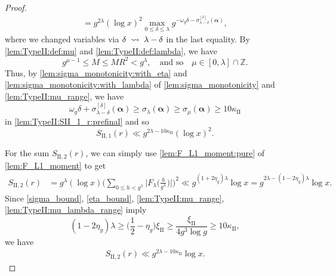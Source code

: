 \documentclass[hidelinks]{amsart}
\numberwithin{equation}{section}
\theoremstyle{plain}
\theoremstyle{definition}
\renewcommand{\leadsto}{\DOTSB\;\rightsquigarrow\;}
\begin{document}
\begin{proof}
\begin{equation}
\begin{aligned}
=
g^{2\lambda}
(\log x)^{2}
\max_{0\le\delta\le\lambda}
g^{-\omega_{g}\delta-\sigma_{\lambda-\delta}^{[\delta]}(\bm{\alpha})},
\end{aligned}
\end{equation}
where we changed variables via $\delta\leadsto\lambda-\delta$ in the last equality.
By \cref{lem:TypeII:def:mu} and \cref{lem:TypeII:def:lambda}, we have
\begin{equation}
\label{lem:TypeII:mu_lambda_range}
g^{\mu-1}\le M\le MR^{2}<g^{\lambda},
\quad\text{and so}\quad
\mu\in[0,\lambda]\cap\mathbb{Z}.
\end{equation}
Thus, by \cref{lem:sigma_monotonicity:with_eta} and \cref{lem:sigma_monotonicity:with_lambda}
of \cref{lem:sigma_monotonicity} and \cref{lem:TypeII:mu_range},
we have
\[
\omega_{g}\delta+\sigma_{\lambda-\delta}^{[\delta]}(\bm{\alpha})
\ge
\sigma_{\lambda}(\bm{\alpha})
\ge
\sigma_{\mu}(\bm{\alpha})
\ge
10\kappa_{\mathrm{II}}
\]
in \cref{lem:TypeII:SII_1_r:prefinal} and so
\begin{equation}
\label{lem:TypeII:SII_1_r}
S_{\mathrm{II},1}(r)
\ll
g^{2\lambda-10\kappa_{\mathrm{II}}}(\log x)^{2}.
\end{equation}

For the sum $S_{\mathrm{II},2}(r)$,
we can simply use \cref{lem:F_L1_moment:pure} of \cref{lem:F_L1_moment} to get
\begin{align}
S_{\mathrm{II},2}(r)
&=
g^{\lambda}(\log x)
\biggl(
\sum_{0\le h<g^{\lambda}}
\biggl|F_{\lambda}\biggl(\frac{h}{g^{\lambda}}\biggr)\biggr|
\biggr)^{2}
\ll
g^{(1+2\eta_{g})\lambda}\log x
=
g^{2\lambda-(1-2\eta_{g})\lambda}\log x.
\end{align}
Since
\cref{sigma_bound},
\cref{eta_bound}, 
\cref{lem:TypeII:mu_range},
\cref{lem:TypeII:mu_lambda_range} imply
\[
(1-2\eta_{g})\lambda
\ge
\biggl(\frac{1}{2}-\eta_{g}\biggr)\xi_{\mathrm{II}}
\ge
\frac{\xi_{\mathrm{II}}}{4g^{3}\log g}
\ge
10\kappa_{\mathrm{II}},
\]
we have
\begin{equation}
\label{lem:TypeII:SII_2_r}
\begin{aligned}
S_{\mathrm{II},2}(r)
\ll
g^{2\lambda-10\kappa_{\mathrm{II}}}\log x.
\end{aligned}
\end{equation}


\end{proof}
\end{document}
